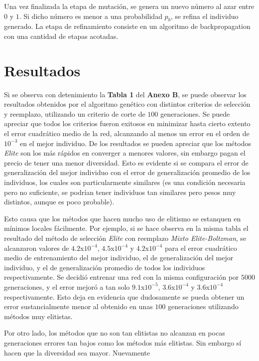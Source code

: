 \documentclass[%
    final,
    reprint,
    notitlepage,
    narroweqnarray,
    inline,
    twoside,
    invited
    ]{ieee}
\begin{document}
Una vez finalizada la etapa de mutación, se genera un nuevo número al azar entre $0$ y $1$. Si dicho número 
es menor a una probabilidad $p_b$, se refina el individuo generado. La etapa de refinamiento consiste en 
un algoritmo de backpropagation con una cantidad de etapas acotadas. 


\section{Resultados}

Si se observa con detenimiento la \textbf{Tabla 1} del \textbf{Anexo B}, se puede observar los resultados 
obtenidos por el algoritmo genético con distintos criterios de selección y reemplazo, utilizando 
un criterio de corte de $100$ generaciones. Se puede apreciar que todos los criterios 
fueron exitosos en minimizar hasta cierto extento el error cuadrático medio de la red, alcanzando al menos 
un error en el orden de $10^{-3}$ en el mejor individuo. De los resultados se pueden apreciar que 
los métodos \textit{Elite} son los más rápidos en converger a menores valores, sin embargo pagan el precio 
de tener una menor diversidad. Esto es evidente si se compara el error de generalización del mejor individuo 
con el error de generalización promedio de los individuos, los cuales son particularmente similares (es una 
condición necesaria pero no suficiente, se podrían tener individuos tan similares pero pesos muy 
distintos, aunque es poco probable). 
\par Esto causa que los métodos que hacen mucho uso de elitismo se estanquen 
en mínimos locales fácilmente. Por ejemplo, si se hace observa en la misma tabla el resultado del método 
de selección \textit{Elite} con reemplazo \textit{Mixto Elite-Boltzman}, se alcanzaron valores de 
$4.2$x$10^{-4}$, $4.5$x$10^{-4}$ y $4.2$x$10^{-4}$ para el error cuadrático medio de entrenamiento del 
mejor individuo, el de generalización del mejor individuo, y el de generalización promedio de todos los individuos 
respectivamente. Se decidió entrenar una red con la misma configuración por $5000$ generaciones, y el error mejoró a 
tan solo $9.1$x$10^{-5}$, $3.6$x$10^{-4}$ y $3.6$x$10^{-4}$ respectivamente. Esto deja en evidencia que 
dudosamente se pueda obtener un error sustancialmente menor al obtenido en unas $100$ generaciones utilizando 
métodos muy elitistas.
\par Por otro lado, los métodos que no son tan elitistas no alcanzan en pocas generaciones errores 
tan bajos como los métodos más elitistas. Sin embargo sí hacen que la diversidad sea mayor. Nuevamente 
\end{document}
